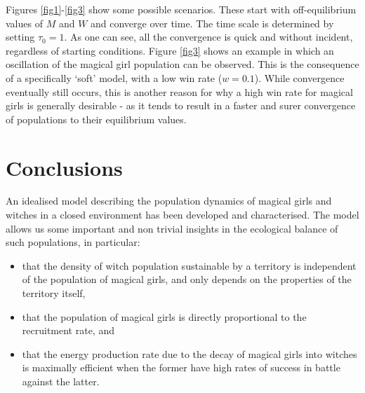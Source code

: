 \documentclass[]{article}
\begin{document}
Figures \ref{fig1}-\ref{fig3} show some possible scenarios. These start with off-equilibrium values of $M$ and $W$ and converge over time. The time scale is determined by setting $\tau_0=1$. As one can see, all the convergence is quick and without incident, regardless of starting conditions. Figure \ref{fig3} shows an example in which an oscillation of the magical girl population can be observed. This is the consequence of a specifically `soft' model, with a low win rate ($w=0.1$). While convergence eventually still occurs, this is another reason for why a high win rate for magical girls is generally desirable - as it tends to result in a faster and surer convergence of populations to their equilibrium values.

\section{Conclusions}
An idealised model describing the population dynamics of magical girls and witches in a closed environment has been developed and characterised. The model allows us some important and non trivial insights in the ecological balance of such populations, in particular:

\begin{itemize}
	\item that the density of witch population sustainable by a territory is independent of the population of magical girls, and only depends on the properties of the territory itself,
	\item that the population of magical girls is directly proportional to the recruitment rate, and
	\item that the energy production rate due to the decay of magical girls into witches is maximally efficient when the former have high rates of success in battle against the latter.
\end{itemize}
\end{document}

